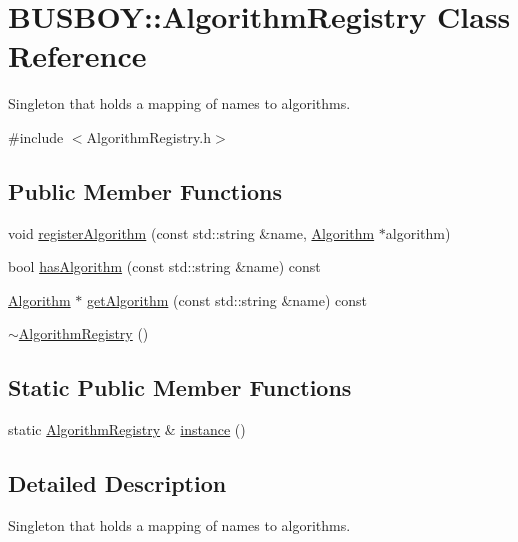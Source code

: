 \hypertarget{classBUSBOY_1_1AlgorithmRegistry}{
\section{BUSBOY::AlgorithmRegistry Class Reference}
\label{classBUSBOY_1_1AlgorithmRegistry}
}


Singleton that holds a mapping of names to algorithms.  


{\ttfamily \#include $<$AlgorithmRegistry.h$>$}\subsection*{Public Member Functions}
\begin{DoxyCompactItemize}
\item 
void \hyperlink{classBUSBOY_1_1AlgorithmRegistry_a5fa9ee449f01c81ed0ca52d288fdf4d8}{registerAlgorithm} (const std::string \&name, \hyperlink{classBUSBOY_1_1Algorithm}{Algorithm} $\ast$algorithm)
\item 
bool \hyperlink{classBUSBOY_1_1AlgorithmRegistry_a6ab4e7174956a41cc49f69ed11cff86b}{hasAlgorithm} (const std::string \&name) const 
\item 
\hyperlink{classBUSBOY_1_1Algorithm}{Algorithm} $\ast$ \hyperlink{classBUSBOY_1_1AlgorithmRegistry_a5bbc93fa93e08cddbc414c31babbf93c}{getAlgorithm} (const std::string \&name) const 
\item 
\hyperlink{classBUSBOY_1_1AlgorithmRegistry_a7d9a6ae87859819ec23f1bbac9e1e7ad}{$\sim$AlgorithmRegistry} ()
\end{DoxyCompactItemize}
\subsection*{Static Public Member Functions}
\begin{DoxyCompactItemize}
\item 
static \hyperlink{classBUSBOY_1_1AlgorithmRegistry}{AlgorithmRegistry} \& \hyperlink{classBUSBOY_1_1AlgorithmRegistry_a1e5e862ee4add10f55d0644d17c6e6a1}{instance} ()
\end{DoxyCompactItemize}


\subsection{Detailed Description}
Singleton that holds a mapping of names to algorithms. 

